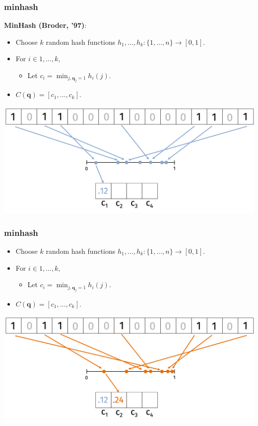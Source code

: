 \documentclass[compress]{beamer}
\newcommand{\bv}[1]{\mathbf{#1}}
\begin{document}
\begin{frame}
	\frametitle{minhash}
	\textbf{MinHash (Broder, '97)}:
	\begin{itemize}
		\item Choose $k$ random hash functions $h_1, \ldots, h_k: \{1,\ldots, n\} \rightarrow [0,1]$. 
		\item For $i\in 1, \ldots,k$, 
		\begin{itemize}
			\item Let $c_i = \min_{j, \bv{q}_j = 1} h_i(j)$.
		\end{itemize}
		\item $C(\bv{q}) = [c_1, \ldots, c_k]$.
	\end{itemize}
	\begin{center}
		\includegraphics[width=\textwidth]{minHash1.png}	
	\end{center}
\end{frame}

\begin{frame}
	\frametitle{minhash}
	\begin{itemize}
		\item Choose $k$ random hash functions $h_1, \ldots, h_k: \{1,\ldots, n\} \rightarrow [0,1]$. 
		\item For $i\in 1, \ldots,k$, 
		\begin{itemize}
			\item Let $c_i = \min_{j, \bv{q}_j = 1} h_i(j)$.
		\end{itemize}
		\item $C(\bv{q}) = [c_1, \ldots, c_k]$.
	\end{itemize}
	\begin{center}
		\includegraphics[width=\textwidth]{minHash2.png}	
	\end{center}
\end{frame}
\end{document}
